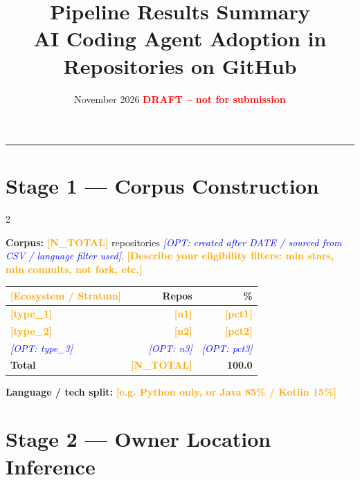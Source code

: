 \documentclass[10pt,a4paper]{article}
\title{\textbf{Pipeline Results Summary}\\
\large AI Coding Agent Adoption in \FILLIN{STACK\_NAME} Repositories on GitHub\\[2pt]
\normalsize \FILLIN{Your Full Name}}
\date{November 2026 \quad \textcolor{red}{\textbf{DRAFT -- not for submission}}}
\newcommand{\FILLIN}[1]{\textcolor{orange}{\textbf{[#1]}}}
\newcommand{\OPT}[1]{\textcolor{blue}{\textit{[OPT: #1]}}}
\begin{document}
\maketitle
\vspace{-4pt}
\hrule
\vspace{8pt}

\section*{Stage 1 --- Corpus Construction}

\begin{multicols}{2}

\textbf{Corpus:} \FILLIN{N\_TOTAL} repositories
\OPT{created after DATE / sourced from CSV / language filter used}.
\FILLIN{Describe your eligibility filters: min stars, min commits, not fork, etc.}

\begin{tabular}{@{}lrr@{}}
\toprule
\FILLIN{Ecosystem / Stratum} & Repos & \% \\
\midrule
\FILLIN{type\_1} & \FILLIN{n1} & \FILLIN{pct1} \\
\FILLIN{type\_2} & \FILLIN{n2} & \FILLIN{pct2} \\
\OPT{type\_3}    & \OPT{n3}    & \OPT{pct3}    \\
\midrule
\textbf{Total} & \textbf{\FILLIN{N\_TOTAL}} & \textbf{100.0} \\
\bottomrule
\end{tabular}

\columnbreak

\textbf{Language / tech split:}
\FILLIN{e.g. Python only, or Java 85\% / Kotlin 15\%}

\vspace{6pt}
\section*{Stage 2 --- Owner Location Inference}


\end{multicols}
\end{document}
